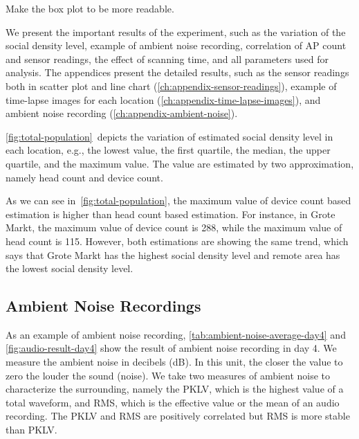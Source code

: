 Make the box plot to be more readable.

We present the important results of the experiment, such as the variation of the social density level, example of ambient noise recording, correlation of \ac{AP} count and sensor readings, the effect of scanning time, and all parameters used for analysis. The appendices present the detailed results, such as the sensor readings both in scatter plot and line chart (\autoref{ch:appendix-sensor-readings}), example of time-lapse images for each location (\autoref{ch:appendix-time-lapse-images}), and ambient noise recording (\autoref{ch:appendix-ambient-noise}).

\autoref{fig:total-population}~depicts the variation of estimated social density level in each location, e.g., the lowest value, the first quartile, the median, the upper quartile, and the maximum value. The value are estimated by two approximation, namely head count and device count.

As we can see in~\autoref{fig:total-population}, the maximum value of device count based estimation is higher than head count based estimation. For instance, in Grote Markt, the maximum value of device count is 288, while the maximum value of head count is 115. However, both estimations are showing the same trend, which says that Grote Markt has the highest social density level and remote area has the lowest social density level.













	\subsection{Ambient Noise Recordings} %
	\label{sub:ambient_noise_recordings}
	As an example of ambient noise recording, \autoref{tab:ambient-noise-average-day4} and \autoref{fig:audio-result-day4} show the result of ambient noise recording in day 4. We measure the ambient noise in decibels (dB). In this unit, the closer the value to zero the louder the sound (noise). We take two measures of ambient noise to characterize the surrounding, namely the \ac{PKLV}, which is the highest value of a total waveform, and \ac{RMS}, which is the effective value or the mean of an audio recording. The \ac{PKLV} and \ac{RMS} are positively correlated but \ac{RMS} is more stable than \ac{PKLV}.

